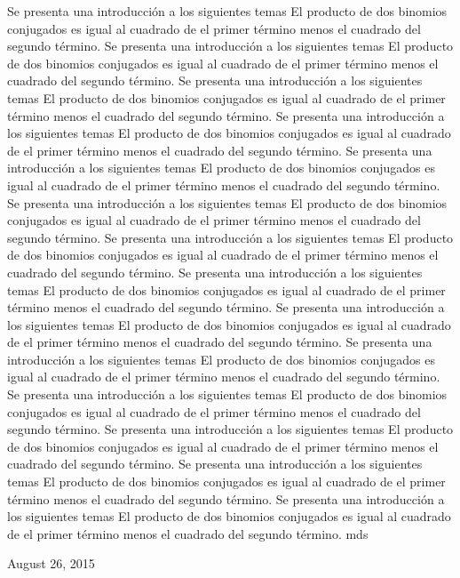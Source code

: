 \documentclass[journal]{IEEEtran}
\begin{document}
Se presenta una introducción a los siguientes temas El producto de dos binomios conjugados es igual al cuadrado de el primer término menos el cuadrado del segundo término.
Se presenta una introducción a los siguientes temas El producto de dos binomios conjugados es igual al cuadrado de el primer término menos el cuadrado del segundo término.
Se presenta una introducción a los siguientes temas El producto de dos binomios conjugados es igual al cuadrado de el primer término menos el cuadrado del segundo término.
Se presenta una introducción a los siguientes temas El producto de dos binomios conjugados es igual al cuadrado de el primer término menos el cuadrado del segundo término.
Se presenta una introducción a los siguientes temas El producto de dos binomios conjugados es igual al cuadrado de el primer término menos el cuadrado del segundo término.
Se presenta una introducción a los siguientes temas El producto de dos binomios conjugados es igual al cuadrado de el primer término menos el cuadrado del segundo término.
Se presenta una introducción a los siguientes temas El producto de dos binomios conjugados es igual al cuadrado de el primer término menos el cuadrado del segundo término.
Se presenta una introducción a los siguientes temas El producto de dos binomios conjugados es igual al cuadrado de el primer término menos el cuadrado del segundo término.
Se presenta una introducción a los siguientes temas El producto de dos binomios conjugados es igual al cuadrado de el primer término menos el cuadrado del segundo término.
Se presenta una introducción a los siguientes temas El producto de dos binomios conjugados es igual al cuadrado de el primer término menos el cuadrado del segundo término.
Se presenta una introducción a los siguientes temas El producto de dos binomios conjugados es igual al cuadrado de el primer término menos el cuadrado del segundo término.
Se presenta una introducción a los siguientes temas El producto de dos binomios conjugados es igual al cuadrado de el primer término menos el cuadrado del segundo término.
Se presenta una introducción a los siguientes temas El producto de dos binomios conjugados es igual al cuadrado de el primer término menos el cuadrado del segundo término.
Se presenta una introducción a los siguientes temas El producto de dos binomios conjugados es igual al cuadrado de el primer término menos el cuadrado del segundo término.
\hfill mds
 
\hfill August 26, 2015
\end{document}
